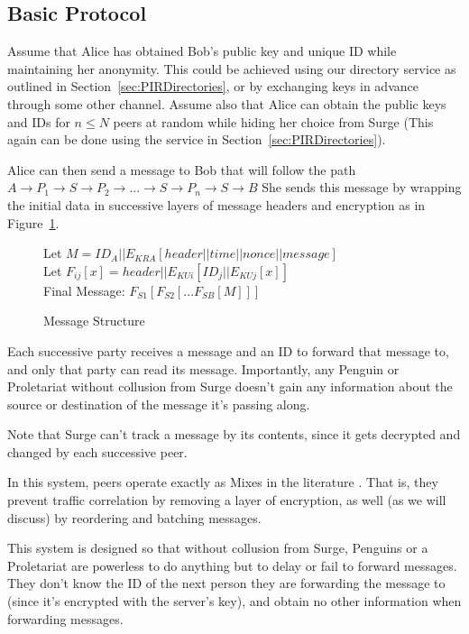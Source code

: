 \documentclass[twocolumn,11pt,english]{article}
\begin{document}
\subsection{Basic Protocol}
Assume that Alice has obtained Bob's public key and unique ID while maintaining her anonymity. This could be achieved using our directory service as outlined in Section~\ref{sec:PIRDirectories}, or by exchanging keys in advance through some other channel. Assume also that Alice can obtain the public keys and IDs for $n \le N$ peers at random while hiding her choice from Surge (This again can be done using the service in Section~\ref{sec:PIRDirectories}).

Alice can then send a message to Bob that will follow the path 
\\$A \rightarrow P_1 \rightarrow S \rightarrow P_2 \rightarrow ... \rightarrow S \rightarrow P_n \rightarrow S \rightarrow B$ 
She sends this message by wrapping the initial data in successive layers of message headers and encryption as in Figure~\ref{messageStructure}.
\\
\begin{figure}[h]
Let \scriptsize$M = ID_A||E_{KRA}[ header || time || nonce || message ]$
\normalsize
\\Let \scriptsize$F_{ij}[x] = header||E_{KUi}[ ID_j || E_{KUj}[ x ] ]$
\normalsize
\\
Final Message: $F_{S1}[F_{S2}[...F_{SB}[ M ]]]$
\caption{Message Structure}
\label{messageStructure}
\end{figure}

Each successive party receives a message and an ID to forward that message to, and only that party can read its message. Importantly, any Penguin or Proletariat without collusion from Surge doesn't gain any information about the source or destination of the message it's passing along. 

Note that Surge can't track a message by its contents, since it gets decrypted and changed by each successive peer. 

In this system, peers operate exactly as Mixes in the literature \cite{chaum-mix} . That is, they prevent traffic correlation by removing a layer of encryption, as well (as we will discuss) by reordering and batching messages. 

This system is designed so that without collusion from Surge, Penguins or a Proletariat are powerless to do anything but to delay or fail to forward messages. They don't know the ID of the next person they are forwarding the message to (since it's encrypted with the server's key), and obtain no other information when forwarding messages. 
\end{document}
